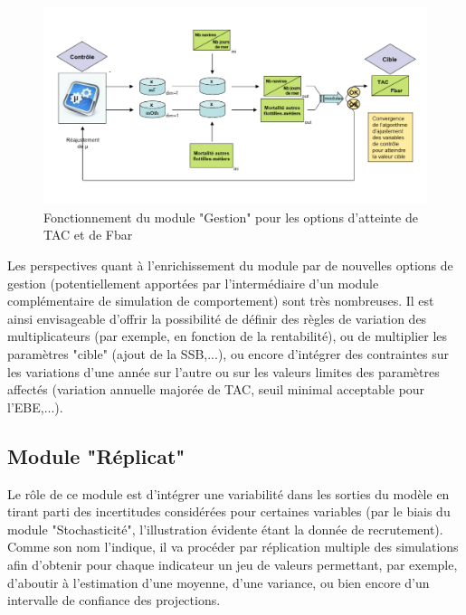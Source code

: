 \documentclass[12pt, colorinlistoftodos, notitlepage]{report}
\newenvironment{not used}[1]{%
    \longtable{%
        |>{\centering$\displaystyle}A{#1}{1}<{$}%
        |}\hline\ignorespaces}{%
    \endlongtable\ignorespacesafterend}
\begin{document}
\begin{figure}
\begin{center}
\includegraphics[width = 17cm]{figures/Gestion_module.png}
\end{center}
\caption{Fonctionnement du module "Gestion" pour les options d'atteinte de TAC et de Fbar}
\label{fig:gest_mod}
\end{figure}

Les perspectives quant à l'enrichissement du module par de nouvelles options de gestion (potentiellement apportées par l'intermédiaire d'un module complémentaire de simulation de comportement) sont très nombreuses. Il est ainsi envisageable d'offrir la possibilité de définir des règles de variation des multiplicateurs (par exemple, en fonction de la rentabilité), ou de multiplier les paramètres "cible" (ajout de la SSB,...), ou encore d'intégrer des contraintes sur les variations d'une année sur l'autre ou sur les valeurs limites des paramètres affectés (variation annuelle majorée de TAC, seuil minimal acceptable pour l'EBE,...).

\subsection{Module "Réplicat"}

Le rôle de ce module est d'intégrer une variabilité dans les sorties du modèle en tirant parti des incertitudes considérées pour certaines variables (par le biais du module "Stochasticité", l'illustration évidente étant la donnée de recrutement). Comme son nom l'indique, il va procéder par réplication multiple des simulations afin d'obtenir pour chaque indicateur un jeu de valeurs permettant, par exemple, d'aboutir à l'estimation d'une moyenne, d'une variance, ou bien encore d'un intervalle de confiance des projections.
\end{document}
